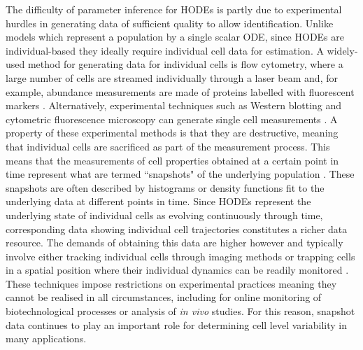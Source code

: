 The difficulty of parameter inference for HODEs is partly due to experimental hurdles in generating data of sufficient quality to allow identification. Unlike models which represent a population by a single scalar ODE, since HODEs are individual-based they ideally require individual cell data for estimation. A widely-used method for generating data for individual cells is flow cytometry, where a large number of cells are streamed individually through a laser beam and, for example, abundance measurements are made of proteins labelled with fluorescent markers \cite{telford2012flow}. Alternatively, experimental techniques such as Western blotting and cytometric fluorescence microscopy can generate single cell measurements \cite{hughes2014single,hasenauer2011identification}. A property of these experimental methods is that they are destructive, meaning that individual cells are sacrificed as part of the measurement process. This means that the measurements of cell properties obtained at a certain point in time represent what are termed ``snapshots" of the underlying population \cite{hasenauer2011identification}. These snapshots are often described by histograms \cite{dixit2018maximum} or density functions \cite{waldherr2018estimation} fit to the underlying data at different points in time. Since HODEs represent the underlying state of individual cells as evolving continuously through time, corresponding data showing individual cell trajectories constitutes a richer data resource. The demands of obtaining this data are higher however and typically involve either tracking individual cells through imaging methods \cite{hilsenbeck2016software} or trapping cells in a spatial position where their individual dynamics can be readily monitored \cite{fritzsch2012single}. These techniques impose restrictions on experimental practices meaning they cannot be realised in all circumstances, including for online monitoring of biotechnological processes or analysis of \textit{in vivo} studies. For this reason, snapshot data continues to play an important role for determining cell level variability in many applications.


